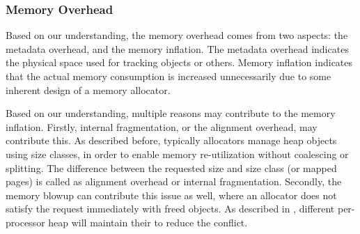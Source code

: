 \subsubsection{Memory Overhead}

Based on our understanding, the memory overhead comes from two aspects: the metadata overhead, and the memory inflation. The metadata overhead indicates the physical space used for tracking objects or others. Memory inflation indicates that the actual memory consumption is increased unnecessarily due to some inherent design of a memory allocator. 

Based on our understanding, multiple reasons may contribute to the memory inflation.  Firstly, internal fragmentation, or the alignment overhead, may contribute this. As described before, typically allocators manage heap objects using size classes, in order to enable  memory re-utilization without coalescing or splitting. The difference between the requested size and size class (or mapped pages) is called as alignment overhead or internal fragmentation. Secondly, the memory blowup can contribute this issue as well, where an allocator does not satisfy the request immediately with freed objects. As described in , different per-processor heap will maintain their to reduce the conflict.   

